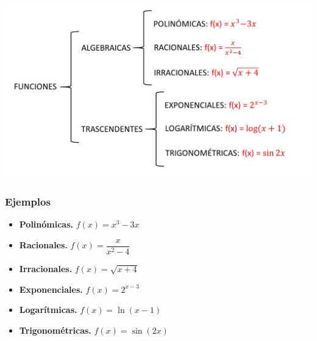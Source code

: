 \includegraphics{samples/analisis/clasificaEsquema2.jpg}
\subsubsection{Ejemplos}
\begin{itemize}
	\item \textbf{Polinómicas.}
	$f(x) = x^3-3x$
	\item \textbf{Racionales.}
	$f(x) = \dfrac{x}{x^2-4}$
	\item \textbf{Irracionales.}
	$f(x) = \sqrt{x+4}$
	\item \textbf{Exponenciales.}
	$f(x) = 2^{x-3}$
	\item \textbf{Logarítmicas.}
	$f(x) = \ln (x-1)$
	\item \textbf{Trigonométricas.}
	$f(x) = \sin(2x)$
\end{itemize}